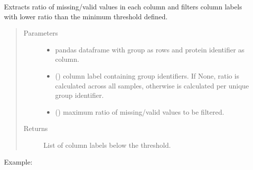 \documentclass[letterpaper,10pt,english]{sphinxmanual}
\begin{document}

\begin{fulllineitems}
\label{\detokenize{_autosummary/analytics_core.analytics:analytics_core.analytics.analytics.extract_percentage_missing}}
Extracts ratio of missing/valid values in each column and filters column labels with lower ratio than the minimum threshold defined.
\begin{quote}\begin{description}
\item[{Parameters}] \leavevmode\begin{itemize}
\item {} 
 \textendash{} pandas dataframe with group as rows and protein identifier as column.

\item {} 
 () \textendash{} column label containing group identifiers. If None, ratio is calculated across all samples, otherwise is calculated per unique group identifier.

\item {} 
 () \textendash{} maximum ratio of missing/valid values to be filtered.

\end{itemize}

\item[{Returns}] \leavevmode
List of column labels below the threshold.

\end{description}\end{quote}

Example:

\begin{sphinxVerbatim}[commandchars=\\\{\}]
    \PYG{p}{[}\PYG{p}{]} 
\end{sphinxVerbatim}

\end{fulllineitems}
\end{document}
